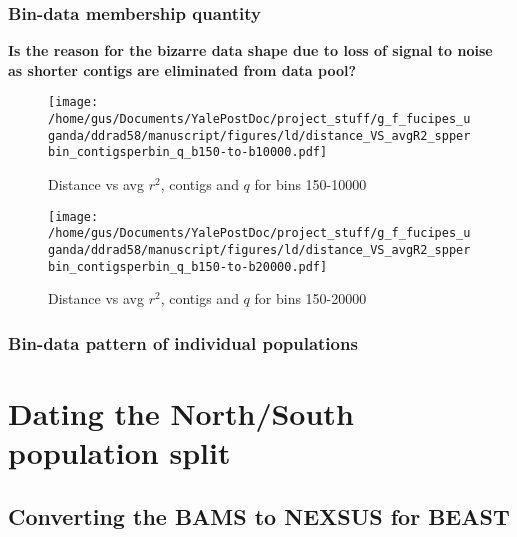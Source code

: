 \documentclass[letterpaper]{scrartcl}
\begin{document}
\subsubsection{Bin-data membership
quantity}\label{bin-data-membership-quantity}

\textbf{Is the reason for the bizarre data shape due to loss of signal
to noise as shorter contigs are eliminated from data pool?}

\begin{figure}[htbp]
\centering
\texttt{[image: /home/gus/Documents/YalePostDoc/project\_stuff/g\_f\_fucipes\_uganda/ddrad58/manuscript/figures/ld/distance\_VS\_avgR2\_spperbin\_contigsperbin\_q\_b150-to-b10000.pdf]}
\caption{Distance vs avg \(r^2\), contigs and \(q\) for bins 150-10000}
\end{figure}

\begin{figure}[htbp]
\centering
\texttt{[image: /home/gus/Documents/YalePostDoc/project\_stuff/g\_f\_fucipes\_uganda/ddrad58/manuscript/figures/ld/distance\_VS\_avgR2\_spperbin\_contigsperbin\_q\_b150-to-b20000.pdf]}
\caption{Distance vs avg \(r^2\), contigs and \(q\) for bins 150-20000}
\end{figure}

\subsubsection{Bin-data pattern of individual
populations}\label{bin-data-pattern-of-individual-populations}

\section{Dating the North/South population
split}\label{dating-the-northsouth-population-split}

\subsection{Converting the BAMS to NEXSUS for
BEAST}\label{converting-the-bams-to-nexsus-for-beast}
\end{document}
